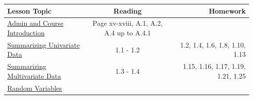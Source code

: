 \documentclass[]{book}
\theoremstyle{definition}
\theoremstyle{definition}
\theoremstyle{definition}
\theoremstyle{remark}
\begin{document}
\begin{longtable}[]{@{}lcr@{}}
\toprule
\begin{minipage}[b]{0.29\columnwidth}\raggedright\strut
Lesson Topic\strut
\end{minipage} & \begin{minipage}[b]{0.33\columnwidth}\centering\strut
Reading\strut
\end{minipage} & \begin{minipage}[b]{0.29\columnwidth}\raggedleft\strut
Homework\strut
\end{minipage}\tabularnewline
\midrule
\endhead
\begin{minipage}[t]{0.29\columnwidth}\raggedright\strut
\protect\hyperlink{L1}{Admin and Course Introduction}\strut
\end{minipage} & \begin{minipage}[t]{0.33\columnwidth}\centering\strut
Page xv-xviii, A.1, A.2, A.4 up to A.4.1\strut
\end{minipage} & \begin{minipage}[t]{0.29\columnwidth}\raggedleft\strut
\strut
\end{minipage}\tabularnewline
\begin{minipage}[t]{0.29\columnwidth}\raggedright\strut
\protect\hyperlink{Les2}{Summarizing Univariate Data}\strut
\end{minipage} & \begin{minipage}[t]{0.33\columnwidth}\centering\strut
1.1 - 1.2\strut
\end{minipage} & \begin{minipage}[t]{0.29\columnwidth}\raggedleft\strut
1.2, 1.4, 1.6, 1.8, 1.10, 1.13\strut
\end{minipage}\tabularnewline
\begin{minipage}[t]{0.29\columnwidth}\raggedright\strut
\protect\hyperlink{L3}{Summarizing Multivariate Data}\strut
\end{minipage} & \begin{minipage}[t]{0.33\columnwidth}\centering\strut
1.3 - 1.4\strut
\end{minipage} & \begin{minipage}[t]{0.29\columnwidth}\raggedleft\strut
1.15, 1.16, 1.17, 1.19, 1.21, 1.25\strut
\end{minipage}\tabularnewline
\begin{minipage}[t]{0.29\columnwidth}\raggedright\strut
\protect\hyperlink{L4}{Random Variables}\strut
\end{minipage} & \begin{minipage}[t]{0.33\columnwidth}\centering\strut

\end{minipage}
\end{longtable}
\end{document}
